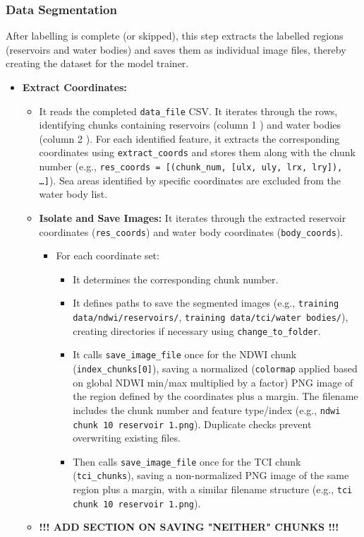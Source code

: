 \subsubsection{Data Segmentation}
After labelling is complete (or skipped), this step extracts the labelled regions (reservoirs and water bodies) and saves them as individual image files, thereby creating the dataset for the model trainer.
\begin{itemize}
    \item \textbf{Extract Coordinates:}
    \begin{itemize}
        \item It reads the completed \verb|data_file| CSV. It iterates through the rows, identifying chunks containing reservoirs (column 1 ) and water bodies (column 2 ). For each identified feature, it extracts the corresponding coordinates using \verb|extract_coords| and stores them along with the chunk number (e.g., \texttt{res\_coords = [(chunk\_num, [ulx, uly, lrx, lry]), \ldots]}). Sea areas identified by specific coordinates are excluded from the water body list.
        \item \textbf{Isolate and Save Images:} It iterates through the extracted reservoir coordinates (\verb|res_coords|) and water body coordinates (\verb|body_coords|).
        \begin{itemize}
            \item For each coordinate set:
            \begin{itemize}
                \item It determines the corresponding chunk number.
                \item It defines paths to save the segmented images (e.g., \texttt{training data/ndwi/reservoirs/}, \texttt{training data/tci/water bodies/}), creating directories if necessary using \verb|change_to_folder|.
                \item It calls \verb|save_image_file| once for the NDWI chunk (\verb|index_chunks[0]|), saving a normalized (\verb|colormap| applied based on global NDWI min/max multiplied by a factor) PNG image of the region defined by the coordinates plus a margin. The filename includes the chunk number and feature type/index (e.g., \verb|ndwi chunk 10 reservoir 1.png|). Duplicate checks prevent overwriting existing files. 
                \item Then calls \verb|save_image_file| once for the TCI chunk (\verb|tci_chunks|), saving a non-normalized PNG image of the same region plus a margin, with a similar filename structure (e.g., \verb|tci chunk 10 reservoir 1.png|).
            \end{itemize}
        \end{itemize}
        \item \textbf{!!! ADD SECTION ON SAVING "NEITHER" CHUNKS !!!}
    \end{itemize}
\end{itemize}

